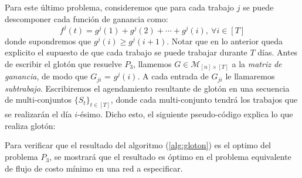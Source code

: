 \documentclass[10pt]{article}
\theoremstyle{plain}
\theoremstyle{definition}
\begin{document}
Para este último problema, consideremos que para cada trabajo $j$ se puede descomponer cada función de ganancia como:
\begin{equation}
\label{eq:desc}
f^j(t) = g^j(1) + g^j(2) + \cdots + g^j(i),\ \forall i \in [T]
\end{equation}
donde supondremos que $g^j(i)\geq g^j(i+1)$. Notar que en lo anterior queda explicito el supuesto de que cada trabajo se puede trabajar durante $T$ días. Antes de escribir el glotón que resuelve $P_3$, llamemos $G\in \mathcal{M}_{[n] \times [T]}$ a la \textit{matriz de ganancia}, de modo que $G_{ji}$ = $g^j(i)$. A cada entrada de $G_{ji}$ le llamaremos \textit{subtrabajo}. Escribiremos el agendamiento resultante de glotón en una secuencia de multi-conjuntos $\{S_t\}_{t \in [T]}$, donde cada multi-conjunto tendrá los trabajos que se realizarán el día $i$-ésimo. Dicho esto, el siguiente pseudo-código explica lo que realiza glotón: 



%
%
%
%
%
%
Para verificar que el resultado del algoritmo (\ref{alg:gloton}) es el optimo del problema $P_3$, se mostrará que el resultado es óptimo en el problema equivalente de flujo de costo mínimo en una red a especificar.\\~\\
\end{document}
